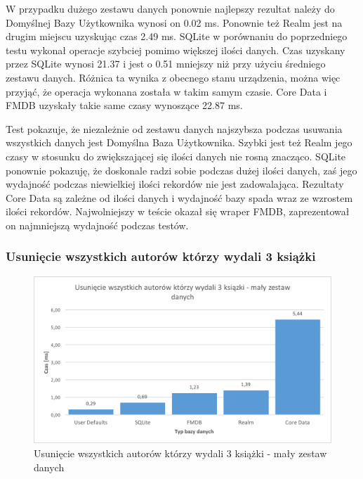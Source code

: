 W przypadku dużego zestawu danych ponownie najlepszy rezultat należy do Domyślnej Bazy Użytkownika wynosi on 0.02 ms. Ponownie też Realm jest na drugim miejscu uzyskując czas 2.49 ms. SQLite w porównaniu do poprzedniego testu wykonał operacje szybciej pomimo większej ilości danych. Czas uzyskany przez SQLite wynosi 21.37 i jest o  0.51 mniejszy niż przy użyciu średniego zestawu danych. Różnica ta wynika z obecnego stanu urządzenia, można więc przyjąć, że operacja wykonana została w takim samym czasie. Core Data i FMDB uzyskały takie same czasy wynoszące 22.87 ms. 

Test pokazuje, że niezależnie od zestawu danych najszybsza podczas usuwania wszystkich danych jest Domyślna Baza Użytkownika. Szybki jest też Realm jego czasy w stosunku do zwiększającej się ilości danych nie rosną znacząco. SQLite ponownie pokazuję, że doskonale radzi sobie podczas dużej ilości danych, zaś jego wydajność podczas niewielkiej ilości rekordów nie jest zadowalająca. Rezultaty Core Data są zależne od ilości danych i wydajność bazy spada wraz ze wzrostem ilości rekordów. Najwolniejszy w teście okazał się wraper FMDB, zaprezentował on najmniejszą wydajność podczas testów. 

\subsubsection{Usunięcie wszystkich autorów którzy wydali 3 książki}

\begin{figure}[H]
    \centering\includegraphics[width=\linewidth]{img/delete_data/delete_by_author/delete_by_author_small_test.png}
    \caption{Usunięcie wszystkich autorów którzy wydali 3 książki - mały zestaw danych}
    \label{img: delete-by-author-small}
\end{figure}

